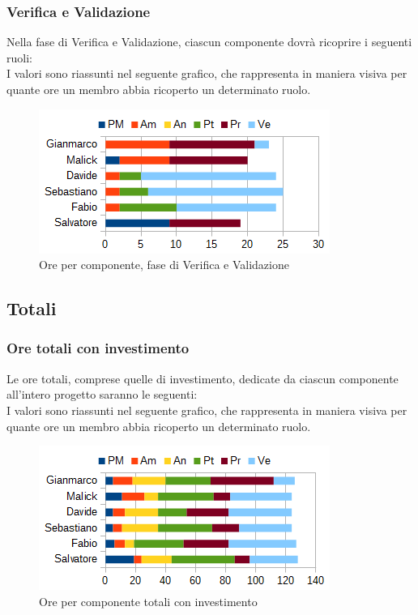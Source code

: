 		\subsubsection{Verifica e Validazione}
		Nella fase di Verifica e Validazione, ciascun componente dovrà ricoprire i seguenti ruoli: \\
		I valori sono riassunti nel seguente grafico, che rappresenta in maniera visiva per quante ore un membro abbia ricoperto un determinato ruolo.
		\begin{figure}[htbp]
			\centering
			\includegraphics[scale=1]{immagini/grafici/validazione-barra.png}
			\caption{Ore per componente, fase di Verifica e Validazione}
		\end{figure}
	\subsection{Totali}
		\subsubsection{Ore totali con investimento}
		Le ore totali, comprese quelle di investimento, dedicate da ciascun componente all'intero progetto saranno le seguenti: \\
		I valori sono riassunti nel seguente grafico, che rappresenta in maniera visiva per quante ore un membro abbia ricoperto un determinato ruolo.
		\begin{figure}[htbp]
			\centering
			\includegraphics[scale=1]{immagini/grafici/riepilogo_conclusivo-barra.png}
			\caption{Ore per componente totali con investimento}
		\end{figure}

